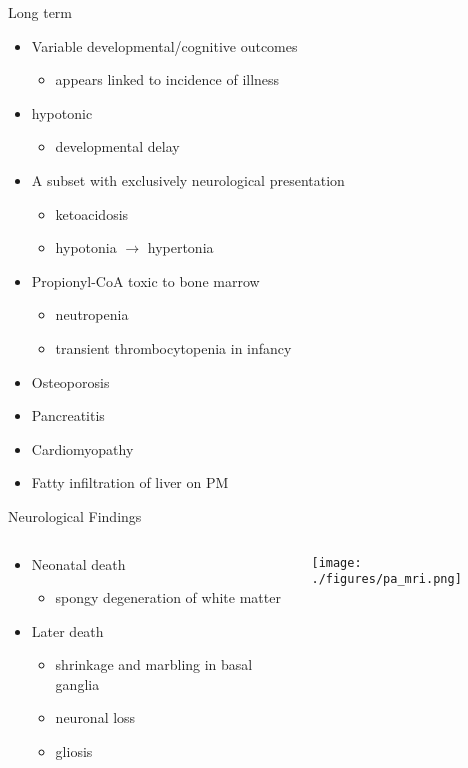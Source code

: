 \documentclass[presentation, smaller]{beamer}
\begin{document}
\begin{frame}[label={sec:orgheadline22}]{Long term}
\begin{itemize}
\item Variable developmental/cognitive outcomes
\begin{itemize}
\item appears linked to incidence of illness
\end{itemize}
\item hypotonic
\begin{itemize}
\item developmental delay
\end{itemize}
\item A subset with exclusively neurological presentation
\begin{itemize}
\item \textpm{} ketoacidosis
\item hypotonia \(\to\) hypertonia
\end{itemize}
\item Propionyl-CoA toxic to bone marrow
\begin{itemize}
\item neutropenia
\item transient thrombocytopenia in infancy
\end{itemize}
\item Osteoporosis
\item Pancreatitis
\item Cardiomyopathy
\item Fatty infiltration of liver on PM
\end{itemize}
\end{frame}

\begin{frame}[label={sec:orgheadline23}]{Neurological Findings}
\begin{columns}
\begin{column}{.5\columnwidth}
\begin{itemize}
\item Neonatal death
\begin{itemize}
\item spongy degeneration of white matter
\end{itemize}
\item Later death
\begin{itemize}
\item shrinkage and marbling in basal ganglia
\item neuronal loss
\item gliosis
\end{itemize}
\end{itemize}
\end{column}
\begin{column}{.5\columnwidth}
\texttt{[image: ./figures/pa\_mri.png]}
\end{column}
\end{columns}
\end{frame}
\end{document}

